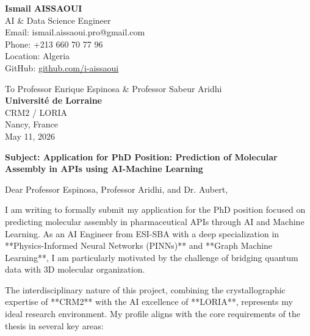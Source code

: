 \documentclass[11pt,a4paper]{article}
\begin{document}
\noindent \textbf{Ismail AISSAOUI} \\
AI \& Data Science Engineer \\
Email: ismail.aissaoui.pro@gmail.com \\
Phone: +213 660 70 77 96 \\
Location: Algeria \\
GitHub: \href{https://github.com/i-aissaoui}{github.com/i-aissaoui}

\bigskip

\begin{flushright}
    To Professor Enrique Espinosa \& Professor Sabeur Aridhi \\
    \textbf{Université de Lorraine} \\
    CRM2 / LORIA \\
    Nancy, France \\
    \medskip
    May 11, 2026
\end{flushright}

\bigskip

\noindent \textbf{Subject: Application for PhD Position: Prediction of Molecular Assembly in APIs using AI-Machine Learning}

\bigskip

\noindent Dear Professor Espinosa, Professor Aridhi, and Dr. Aubert,

\medskip

I am writing to formally submit my application for the PhD position focused on predicting molecular assembly in pharmaceutical APIs through AI and Machine Learning. As an AI Engineer from ESI-SBA with a deep specialization in **Physics-Informed Neural Networks (PINNs)** and **Graph Machine Learning**, I am particularly motivated by the challenge of bridging quantum data with 3D molecular organization.

The interdisciplinary nature of this project, combining the crystallographic expertise of **CRM2** with the AI excellence of **LORIA**, represents my ideal research environment. My profile aligns with the core requirements of the thesis in several key areas:
\end{document}
